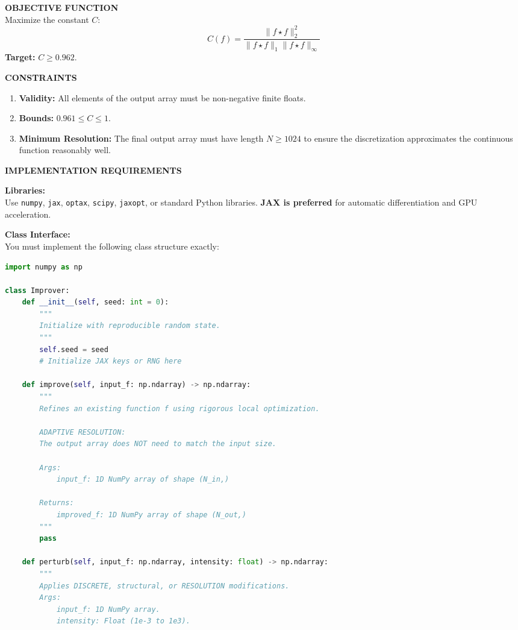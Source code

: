 \documentclass[sigconf]{acmart}
\begin{document}
\begin{paracol}{2}
\noindent \textbf{OBJECTIVE FUNCTION}\\
Maximize the constant $C$:
\[
C(f) = \frac{\|f \star f\|_2^2}{\|f \star f\|_1 \|f \star f\|_\infty}
\]
\textbf{Target:} $C \ge 0.962$.

\vspace{0.3cm}
\noindent \textbf{CONSTRAINTS}
\begin{enumerate}
    \item \textbf{Validity:} All elements of the output array must be non-negative finite floats.
    \item \textbf{Bounds:} $0.961 \le C \le 1$.
    \item \textbf{Minimum Resolution:} The final output array must have length $N \ge 1024$ to ensure the discretization approximates the continuous function reasonably well.
\end{enumerate}

\vspace{0.3cm}
\noindent \textbf{IMPLEMENTATION REQUIREMENTS}

\noindent \textbf{Libraries:}\\
Use \texttt{numpy}, \texttt{jax}, \texttt{optax}, \texttt{scipy}, \texttt{jaxopt}, or standard Python libraries. \textbf{JAX is preferred} for automatic differentiation and GPU acceleration.

\noindent \textbf{Class Interface:}\\
You must implement the following class structure exactly:

\begin{lstlisting}[language=Python, frame=single, basicstyle=\ttfamily\scriptsize]
import numpy as np

class Improver:
    def __init__(self, seed: int = 0):
        """
        Initialize with reproducible random state.
        """
        self.seed = seed
        # Initialize JAX keys or RNG here

    def improve(self, input_f: np.ndarray) -> np.ndarray:
        """
        Refines an existing function f using rigorous local optimization.
        
        ADAPTIVE RESOLUTION:
        The output array does NOT need to match the input size.

        Args:
            input_f: 1D NumPy array of shape (N_in,)

        Returns:
            improved_f: 1D NumPy array of shape (N_out,)
        """
        pass

    def perturb(self, input_f: np.ndarray, intensity: float) -> np.ndarray:
        """
        Applies DISCRETE, structural, or RESOLUTION modifications.
        Args:
            input_f: 1D NumPy array.
            intensity: Float (1e-3 to 1e3).


\end{lstlisting}
\end{paracol}
\end{document}
